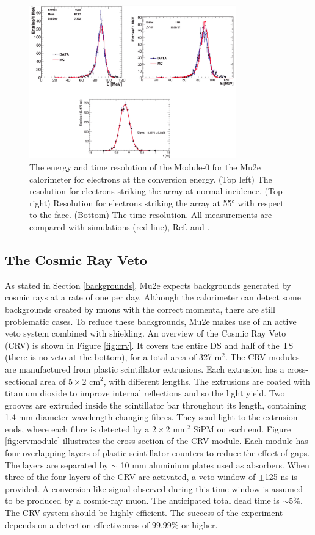 \begin{figure}[!h]
    \centering
    \includegraphics[width =0.8\textwidth]{figures/png/Screenshot_20240330_105520.png}
    \caption{The energy and time resolution of the Module-0 for the Mu2e calorimeter for electrons at the conversion energy. (Top left) The resolution for electrons striking the
    array at normal incidence. (Top right) Resolution for electrons striking the array at 55° with respect to the face. (Bottom) The time resolution. 
    All measurements are compared with simulations (red line), Ref. \cite{bobbb} and \cite{calo95}.}
                \label{fig:calores}
                \end{figure}
\subsection{The Cosmic Ray Veto}\label{CRV}
As stated in Section \ref{backgrounds}, Mu2e expects backgrounds generated by cosmic rays 
at a rate of one per day. Although the calorimeter can detect some backgrounds created 
by muons with the correct momenta, there are still problematic cases. To reduce these 
backgrounds, Mu2e makes use of an active veto system combined with shielding. An overview 
of the Cosmic Ray Veto (CRV) is shown in Figure \ref{fig:crv}. It covers the entire 
DS and half of the TS (there is no veto at the bottom), for a total area of 327 m$^2$.
The CRV modules are manufactured from plastic scintillator extrusions. Each extrusion 
has a cross-sectional area of $5 \times 2$ cm$^2$, with different lengths. The extrusions 
are coated with titanium dioxide to improve internal reflections and so the light yield. 
Two grooves are extruded inside the scintillator bar throughout its length, containing 
1.4 mm diameter wavelength changing fibres. They send light to the extrusion ends, 
where each fibre is detected by a $2 \times 2$ mm$^2$ SiPM on each end. Figure \ref{fig:crvmodule} 
illustrates the cross-section of the CRV module. Each module has four overlapping layers of plastic 
scintillator counters to reduce the effect of gaps. The layers are separated by $\sim$ 10 mm aluminium 
plates used as absorbers. When three of the four layers of the CRV are activated, a veto window of $\pm$125 ns 
is provided. A conversion-like signal observed during this time window is assumed to be produced by a cosmic-ray muon. 
The anticipated total dead time is $\sim$5\%. The CRV system should be highly efficient. 
The success of the experiment depends on a detection effectiveness of 99.99\% or higher.


